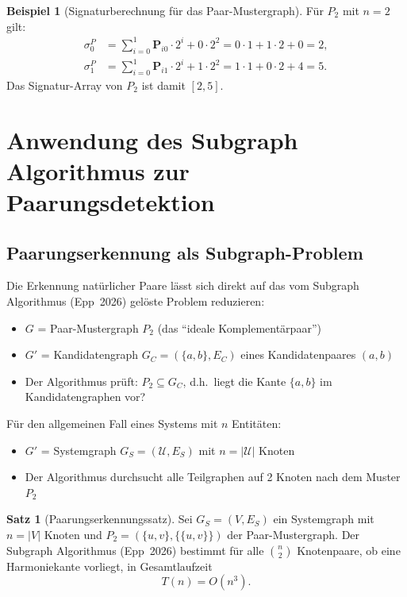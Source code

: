 ﻿\documentclass[a4paper,12pt]{article}
\theoremstyle{definition}
\newtheorem{beispiel}{Beispiel}
\newtheorem{satz}{Satz}
\begin{document}
\begin{beispiel}[Signaturberechnung für das Paar-Mustergraph]
	Für $P_2$ mit $n=2$ gilt:
	\begin{align*}
		\sigma_0^P &= \sum_{i=0}^{1} \mathbf{P}_{i0} \cdot 2^i + 0 \cdot 2^2
		           = 0 \cdot 1 + 1 \cdot 2 + 0 = 2,\\
		\sigma_1^P &= \sum_{i=0}^{1} \mathbf{P}_{i1} \cdot 2^i + 1 \cdot 2^2
		           = 1 \cdot 1 + 0 \cdot 2 + 4 = 5.
	\end{align*}
	Das Signatur-Array von $P_2$ ist damit $[2, 5]$.
\end{beispiel}

\section{Anwendung des Subgraph Algorithmus zur Paarungsdetektion}
\label{sec:subgraph}

\subsection{Paarungserkennung als Subgraph-Problem}

Die Erkennung natürlicher Paare lässt sich direkt auf das vom Subgraph Algorithmus
(Epp~2026) gelöste Problem reduzieren:

\begin{itemize}
	\item $G$ = Paar-Mustergraph $P_2$ (das \enquote{ideale Komplementärpaar})
	\item $G'$ = Kandidatengraph $G_C = (\{a, b\}, E_C)$ eines Kandidatenpaares $(a,b)$
	\item Der Algorithmus prüft: $P_2 \subseteq G_C$, d.h.\ liegt die Kante
	$\{a,b\}$ im Kandidatengraphen vor?
\end{itemize}

Für den allgemeinen Fall eines Systems mit $n$ Entitäten:

\begin{itemize}
	\item $G'$ = Systemgraph $G_S = (\mathcal{U}, E_S)$ mit $n = |\mathcal{U}|$ Knoten
	\item Der Algorithmus durchsucht alle Teilgraphen auf 2 Knoten nach dem Muster $P_2$
\end{itemize}

\begin{satz}[Paarungserkennungssatz]
	\label{satz:erkennung}
	Sei $G_S = (V, E_S)$ ein Systemgraph mit $n = |V|$ Knoten und
	$P_2 = (\{u,v\}, \{\{u,v\}\})$ der Paar-Mustergraph. Der Subgraph Algorithmus
	(Epp~2026) bestimmt für alle $\binom{n}{2}$ Knotenpaare, ob eine Harmoniekante
	vorliegt, in Gesamtlaufzeit
	\[
		T(n) = O(n^3).
	\]
\end{satz}
\end{document}
